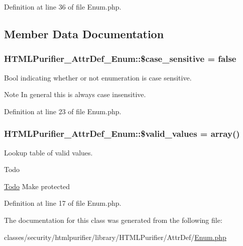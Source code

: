 Definition at line 36 of file Enum.\+php.



\subsection{Member Data Documentation}
\hypertarget{classHTMLPurifier__AttrDef__Enum_a146fbbbb149091688e54c1772a7713ac}{
\subsubsection[{\$case\+\_\+sensitive}]{\setlength{\rightskip}{0pt plus 5cm}H\+T\+M\+L\+Purifier\+\_\+\+Attr\+Def\+\_\+\+Enum\+::\$case\+\_\+sensitive = false\hspace{0.3cm}{\ttfamily [protected]}}}\label{classHTMLPurifier__AttrDef__Enum_a146fbbbb149091688e54c1772a7713ac}
Bool indicating whether or not enumeration is case sensitive. \begin{DoxyNote}{Note}
In general this is always case insensitive. 
\end{DoxyNote}


Definition at line 23 of file Enum.\+php.

\hypertarget{classHTMLPurifier__AttrDef__Enum_abc1df45b8d1bb628e037beae48b951d4}{
\subsubsection[{\$valid\+\_\+values}]{\setlength{\rightskip}{0pt plus 5cm}H\+T\+M\+L\+Purifier\+\_\+\+Attr\+Def\+\_\+\+Enum\+::\$valid\+\_\+values = array()}}\label{classHTMLPurifier__AttrDef__Enum_abc1df45b8d1bb628e037beae48b951d4}
Lookup table of valid values. \begin{DoxyRefDesc}{Todo}
\item[\hyperlink{todo__todo000007}{Todo}]Make protected \end{DoxyRefDesc}


Definition at line 17 of file Enum.\+php.



The documentation for this class was generated from the following file\+:\begin{DoxyCompactItemize}
\item 
classes/security/htmlpurifier/library/\+H\+T\+M\+L\+Purifier/\+Attr\+Def/\hyperlink{Enum_8php}{Enum.\+php}\end{DoxyCompactItemize}
